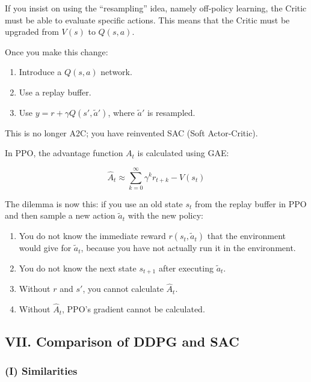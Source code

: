 If you insist on using the ``resampling'' idea, namely off-policy learning, the Critic must be able to evaluate specific actions. This means that the Critic must be upgraded from \(V(s)\) to \(Q(s,a)\).

Once you make this change:

\begin{enumerate}
\def\labelenumi{\arabic{enumi}.}
\tightlist
\item
  Introduce a \(Q(s,a)\) network.
\item
  Use a replay buffer.
\item
  Use \(y=r+\gamma Q(s',\tilde{a}')\), where \(\tilde{a}'\) is resampled.
\end{enumerate}

This is no longer A2C; you have reinvented SAC (Soft Actor-Critic).

In PPO, the advantage function \(A_t\) is calculated using GAE:

\[
\hat{A}_t
\approx
\sum_{k=0}^{\infty}
\gamma^{k} r_{t+k}
-
V(s_t)
\]

The dilemma is now this: if you use an old state \(s_t\) from the replay buffer in PPO and then sample a new action \(\tilde{a}_t\) with the new policy:

\begin{enumerate}
\def\labelenumi{\arabic{enumi}.}
\tightlist
\item
  You do not know the immediate reward \(r(s_t,\tilde{a}_t)\) that the environment would give for \(\tilde{a}_t\), because you have not actually run it in the environment.
\item
  You do not know the next state \(s_{t+1}\) after executing \(\tilde{a}_t\).
\item
  Without \(r\) and \(s'\), you cannot calculate \(\hat{A}_t\).
\item
  Without \(\hat{A}_t\), PPO's gradient cannot be calculated.
\end{enumerate}

\hypertarget{vii.-comparison-of-ddpg-and-sac}{%
\subsection{VII. Comparison of DDPG and SAC}\label{vii.-comparison-of-ddpg-and-sac}}

\hypertarget{i-similarities}{%
\subsubsection{(I) Similarities}\label{i-similarities}}

